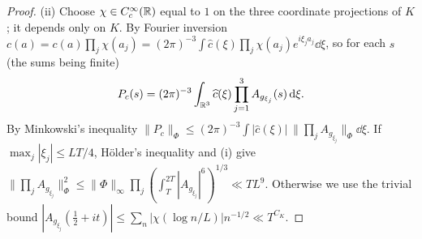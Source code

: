 \documentclass[11pt,colorlinks]{charlie}
\begin{document}
\begin{proof}
(ii) Choose $\chi\in C_c^\infty(\mathbb{R})$ equal to $1$ on the three coordinate projections of $K$; it depends only on $K$. By Fourier inversion $c(a)=c(a)\prod_j\chi(a_j)=(2\pi)^{-3}\int\widehat c(\xi)\prod_j\chi(a_j)e^{i\xi_ja_j}\dd\xi$, so for each $s$ (the sums being finite)
\[
 P_c(s)=(2\pi)^{-3}\int_{\mathbb{R}^3}\widehat c(\xi)\prod_{j=1}^3A_{g_{\xi_j}}(s)\,\mathrm{d}\xi .
\]
By Minkowski's inequality $\|P_c\|_\Phi\le(2\pi)^{-3}\int|\widehat c(\xi)|\,\|\prod_jA_{g_{\xi_j}}\|_\Phi\dd\xi$. If $\max_j|\xi_j|\le LT/4$, H\"older's inequality and (i) give $\|\prod_jA_{g_{\xi_j}}\|_\Phi^2\le\|\Phi\|_\infty\prod_j(\int_T^{2T}|A_{g_{\xi_j}}|^6)^{1/3}\ll TL^9$. Otherwise we use the trivial bound $|A_{g_{\xi_j}}(\frac12+it)|\le\sum_n|\chi(\log n/L)|n^{-1/2}\ll T^{C_K}$.
\end{proof}

\end{document}
